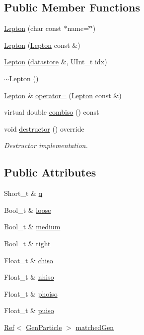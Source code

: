 \subsection*{Public Member Functions}
\begin{DoxyCompactItemize}
\item 
\hyperlink{classpanda_1_1Lepton_a680861ccd79a14296dbde1b00e273e53}{Lepton} (char const $\ast$name=\char`\"{}\char`\"{})
\item 
\hyperlink{classpanda_1_1Lepton_a60b7ecc2ad580303d527f8fb9145e6ec}{Lepton} (\hyperlink{classpanda_1_1Lepton}{Lepton} const \&)
\item 
\hyperlink{classpanda_1_1Lepton_ae01f7cf754060e4b255e38059709aa16}{Lepton} (\hyperlink{structpanda_1_1Element_1_1datastore}{datastore} \&, UInt\_\-t idx)
\item 
\hyperlink{classpanda_1_1Lepton_a3b515cdfe0428633542031f54929f1ff}{$\sim$Lepton} ()
\item 
\hyperlink{classpanda_1_1Lepton}{Lepton} \& \hyperlink{classpanda_1_1Lepton_a24b1cd552930db2af2734d3acbb27257}{operator=} (\hyperlink{classpanda_1_1Lepton}{Lepton} const \&)
\item 
virtual double \hyperlink{classpanda_1_1Lepton_a13fd748ab9e1b76e5cc8391723cc5ea7}{combiso} () const 
\item 
void \hyperlink{classpanda_1_1Lepton_af8bb4d531bdddbf51f479f7eb0dae175}{destructor} () override
\begin{DoxyCompactList}\small\item\em Destructor implementation. \item\end{DoxyCompactList}\end{DoxyCompactItemize}
\subsection*{Public Attributes}
\begin{DoxyCompactItemize}
\item 
Short\_\-t \& \hyperlink{classpanda_1_1Lepton_aac3f4bc13824746a5bbf7e5a7ad7694d}{q}
\item 
Bool\_\-t \& \hyperlink{classpanda_1_1Lepton_a4e452353086dde027d35df70060d74af}{loose}
\item 
Bool\_\-t \& \hyperlink{classpanda_1_1Lepton_a128de197b4eb9e1108ba5cf911d03b3f}{medium}
\item 
Bool\_\-t \& \hyperlink{classpanda_1_1Lepton_af6b18c84138266fa6696b3e599316ba9}{tight}
\item 
Float\_\-t \& \hyperlink{classpanda_1_1Lepton_a2332dfd260c6527fe3dbc4913fc0538e}{chiso}
\item 
Float\_\-t \& \hyperlink{classpanda_1_1Lepton_a617664cd1e7e3cec69842363cfcaca0c}{nhiso}
\item 
Float\_\-t \& \hyperlink{classpanda_1_1Lepton_afb1e1e5df37ead323e9fbe8b60f66370}{phoiso}
\item 
Float\_\-t \& \hyperlink{classpanda_1_1Lepton_a8fd3e4abbeec0cdd9ab5236c9e4f0ac3}{puiso}
\item 
\hyperlink{classpanda_1_1Ref}{Ref}$<$ \hyperlink{classpanda_1_1GenParticle}{GenParticle} $>$ \hyperlink{classpanda_1_1Lepton_a84ee49be4ca28d17c553d9677f372f65}{matchedGen}
\end{DoxyCompactItemize}
